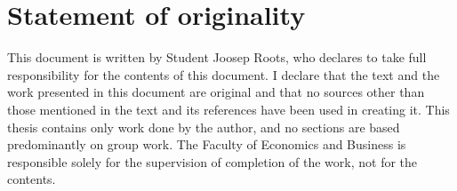 \chapter*{Statement of originality}

This document is written by Student Joosep Roots, who declares to take full responsibility for the contents of this document.
I declare that the text and the work presented in this document are original and that no sources other than those mentioned in the text and its references have been used in creating it.
This thesis contains only work done by the author, and no sections are based predominantly on group work.
The Faculty of Economics and Business is responsible solely for the supervision of completion of the work, not for the contents.